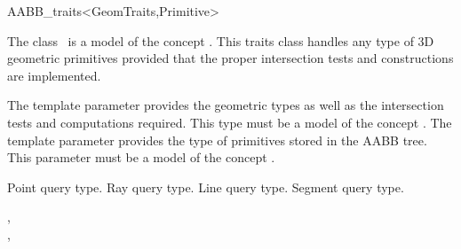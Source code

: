 \ccRefPageBegin


\begin{ccRefClass}{AABB_traits<GeomTraits,Primitive>}


\ccDefinition
  
The class \ccRefName\ is a model of the concept . This traits class handles any type of 3D geometric primitives provided that the proper intersection tests and constructions are implemented.

\ccParameters
The template parameter  provides the geometric types as well as the intersection tests and computations required. This type must be a model of the concept . The template parameter  provides the type of primitives stored in the AABB tree. This parameter must be a model of the concept .


\ccTypes

          {Point query type.}
\ccGlue
{}
          {Ray query type.}
\ccGlue
{}
          {Line query type.}
\ccGlue
{}
          {Segment query type.}
\ccGlue
{}

\ccCreation
{} 

\ccSeeAlso

,\\
, \\
\\


\end{ccRefClass}

\ccRefPageEnd

